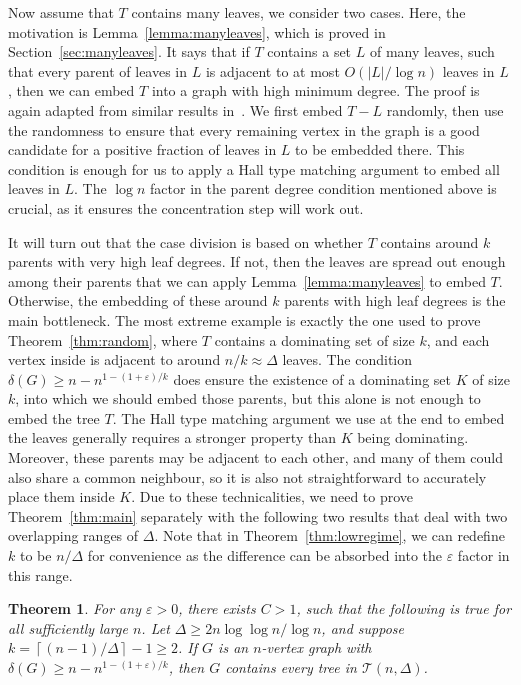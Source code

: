 \documentclass{article}
\theoremstyle{plain}
\newtheorem{theorem}{Theorem}[section]
\theoremstyle{definition}
\numberwithin{equation}{section}
\def\eps{\varepsilon}
\newcommand\ceil[1]{\left\lceil#1\right\rceil}
\newcommand\cT{\mathcal{T}}
\begin{document}
Now assume that $T$ contains many leaves, we consider two cases. Here, the motivation is Lemma~\ref{lemma:manyleaves}, which is proved in Section~\ref{sec:manyleaves}. It says that if $T$ contains a set $L$ of many leaves, such that every parent of leaves in $L$ is adjacent to at most $O(|L|/\log n)$ leaves in $L$, then we can embed $T$ into a graph with high minimum degree. The proof is again adapted from similar results in~\cite{MPY}. We first embed $T-L$ randomly, then use the randomness to ensure that every remaining vertex in the graph is a good candidate for a positive fraction of leaves in $L$ to be embedded there. This condition is enough for us to apply a Hall type matching argument to embed all leaves in $L$. The $\log n$ factor in the parent degree condition mentioned above is crucial, as it ensures the concentration step will work out.

It will turn out that the case division is based on whether $T$ contains around $k$ parents with very high leaf degrees. If not, then the leaves are spread out enough among their parents that we can apply Lemma~\ref{lemma:manyleaves} to embed $T$. Otherwise, the embedding of these around $k$ parents with high leaf degrees is the main bottleneck. The most extreme example is exactly the one used to prove Theorem~\ref{thm:random}, where $T$ contains a dominating set of size $k$, and each vertex inside is adjacent to around $n/k\approx\Delta$ leaves. The condition $\delta(G)\geq n-n^{1-(1+\eps)/k}$ does ensure the existence of a dominating set $K$ of size $k$, into which we should embed those parents, but this alone is not enough to embed the tree $T$. The Hall type matching argument we use at the end to embed the leaves generally requires a stronger property than $K$ being dominating. Moreover, these parents may be adjacent to each other, and many of them could also share a common neighbour, so it is also not straightforward to accurately place them inside $K$. Due to these technicalities, we need to prove Theorem~\ref{thm:main} separately with the following two results that deal with two overlapping ranges of $\Delta$. Note that in Theorem~\ref{thm:lowregime}, we can redefine $k$ to be $n/\Delta$ for convenience as the difference can be absorbed into the $\eps$ factor in this range.
 
\begin{theorem}\label{thm:highregime}
For any $\eps>0$, there exists $C>1$, such that the following is true for all sufficiently large $n$. Let $\Delta\geq2n\log\log n/\log n$, and suppose $k=\ceil{(n-1)/\Delta}-1\geq2$. If $G$ is an $n$-vertex graph with $\delta(G)\geq n-n^{1-(1+\eps)/k}$, then $G$ contains every tree in $\cT(n,\Delta)$.
\end{theorem}
\end{document}
